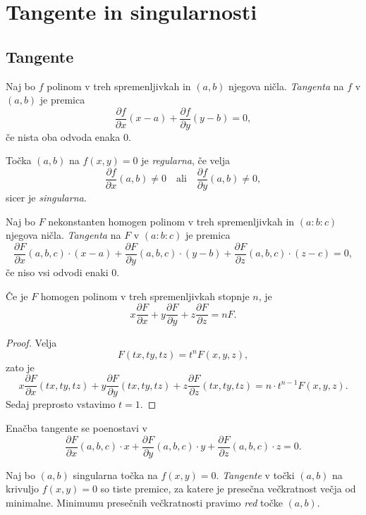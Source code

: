 \section{Tangente in singularnosti}

\subsection{Tangente}

\begin{definicija}
Naj bo $f$ polinom v treh spremenljivkah in $(a, b)$ njegova ničla.
\emph{Tangenta} na $f$ v
$(a, b)$ je premica
\[
\frac{\partial f}{\partial x} (x - a) +
\frac{\partial f}{\partial y} (y - b) =
0,
\]
če nista oba odvoda enaka $0$.
\end{definicija}

\begin{definicija}
Točka $(a, b)$ na $f(x, y) = 0$ je
\emph{regularna}, če velja
\[
\frac{\partial f}{\partial x} (a, b) \ne 0
\quad \text{ali} \quad
\frac{\partial f}{\partial y} (a, b) \ne 0,
\]
sicer je \emph{singularna}.
\end{definicija}

\begin{definicija}
Naj bo $F$ nekonstanten homogen polinom v treh spremenljivkah in
$(a : b : c)$ njegova ničla.
\emph{Tangenta} na $F$ v
$(a : b : c)$ je premica
\[
\frac{\partial F}{\partial x}(a,b,c) \cdot (x - a) +
\frac{\partial F}{\partial y}(a,b,c) \cdot (y - b) +
\frac{\partial F}{\partial z}(a,b,c) \cdot (z - c) =
0,
\]
če niso vsi odvodi enaki $0$.
\end{definicija}

\begin{izrek}
Če je $F$ homogen polinom v treh spremenljivkah stopnje $n$, je
\[
x \frac{\partial F}{\partial x} +
y \frac{\partial F}{\partial y} +
z \frac{\partial F}{\partial z} =
n F.
\]
\end{izrek}

\begin{proof}
Velja
\[
F(tx, ty, tz) = t^n F(x, y, z),
\]
zato je
\[
x \frac{\partial F}{\partial x}(tx, ty, tz) +
y \frac{\partial F}{\partial y}(tx, ty, tz) +
z \frac{\partial F}{\partial z}(tx, ty, tz) =
n \cdot t^{n-1} F(x, y, z).
\]
Sedaj preprosto vstavimo $t = 1$.
\end{proof}

\begin{posledica}
Enačba tangente se poenostavi v
\[
\frac{\partial F}{\partial x}(a,b,c) \cdot x +
\frac{\partial F}{\partial y}(a,b,c) \cdot y +
\frac{\partial F}{\partial z}(a,b,c) \cdot z =
0.
\]
\end{posledica}

\begin{definicija}
Naj bo $(a, b)$ singularna točka na $f(x, y) = 0$. \emph{Tangente}
v točki $(a, b)$ na krivuljo $f(x, y) = 0$ so tiste premice, za
katere je presečna večkratnost večja od minimalne. Minimumu
presečnih večkratnosti pravimo \emph{red} točke
$(a, b)$.
\end{definicija}
